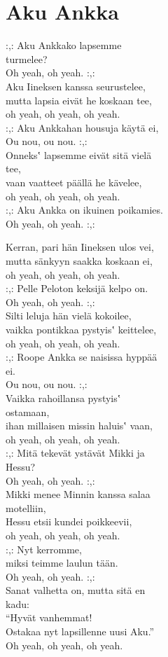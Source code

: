 \section{Aku Ankka}
:,: Aku Ankkako lapsemme\\
turmelee?\\
Oh yeah, oh yeah. :,:\\
Aku Iineksen kanssa seurustelee,\\
mutta lapsia eivät he koskaan tee,\\
oh yeah, oh yeah, oh yeah.\\
:,: Aku Ankkahan housuja käytä ei,\\
Ou nou, ou nou. :,:\\
Onneks‛ lapsemme eivät sitä vielä\\
tee,\\
vaan vaatteet päällä he kävelee,\\
oh yeah, oh yeah, oh yeah.\\
:,: Aku Ankka on ikuinen poikamies.\\
Oh yeah, oh yeah. :,:

Kerran, pari hän Iineksen ulos vei,\\
mutta sänkyyn saakka koskaan ei,\\
oh yeah, oh yeah, oh yeah.\\
:,: Pelle Peloton keksijä kelpo on.\\
Oh yeah, oh yeah. :,:\\
Silti leluja hän vielä kokoilee,\\
vaikka pontikkaa pystyis‛ keittelee,\\
oh yeah, oh yeah, oh yeah.\\
:,: Roope Ankka se naisissa hyppää\\
ei.\\
Ou nou, ou nou. :,:\\
Vaikka rahoillansa pystyis‛\\
ostamaan,\\
ihan millaisen missin haluis‛ vaan,\\
oh yeah, oh yeah, oh yeah.\\
:,: Mitä tekevät ystävät Mikki ja\\
Hessu?\\
Oh yeah, oh yeah. :,:\\
Mikki menee Minnin kanssa salaa\\
motelliin,\\
Hessu etsii kundei poikkeevii,\\
oh yeah, oh yeah, oh yeah.\\
:,: Nyt kerromme,\\
miksi teimme laulun tään.\\
Oh yeah, oh yeah. :,:\\
Sanat valhetta on, mutta sitä en\\
kadu:\\
“Hyvät vanhemmat!\\
Ostakaa nyt lapsillenne uusi Aku.”\\
Oh yeah, oh yeah, oh yeah.